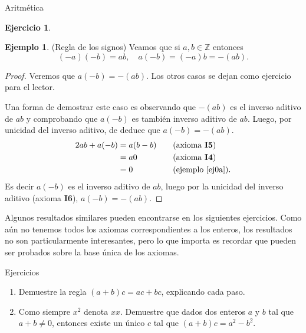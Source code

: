 \documentclass[11pt,spanish,makeidx]{amsbook}
\theoremstyle{definition}
\newtheorem{ejemplo}{Ejemplo}[section]
\newtheorem{ejercicio}{Ejercicio}[section]
\theoremstyle{remark}
\begin{document}
\begin{section}{Aritmética}
\begin{ejercicio}
\end{ejercicio}

\begin{ejemplo} (Regla de los signos) Veamos que  si $a,b \in \mathbb Z$ entonces
$$
(-a)(-b) = ab ,\quad a(-b) = (-a)b = -(ab).
$$
\end{ejemplo}
\begin{proof}
Veremos que  $a(-b) = -(ab)$. Los otros casos se dejan como ejercicio para el lector.

Una forma de demostrar este caso es  observando que $-(ab)$ es el inverso aditivo de $ab$ y comprobando que $a(-b)$ es también inverso aditivo de $ab$. Luego, por unicidad del inverso aditivo, de deduce que $a(-b) = -(ab)$. 
\begin{alignat*}2
ab + a(-b) &=a(b-b)& &\text{(axioma {\bf I5})} \\
&=a0&\quad &\text{(axioma {\bf I4})}\\
&= 0 & &\text{(ejemplo \ref{ej0a})}.
\end{alignat*}
Es decir $a(-b)$ es el inverso aditivo de $ab$, luego por la unicidad del inverso aditivo (axioma {\bf I6}), $a(-b)=-(ab)$.
\end{proof}

Algunos resultados similares pueden encontrarse en los siguientes ejercicios. Como aún no tenemos todos los axiomas correspondientes a los enteros, los resultados no son particularmente interesantes, pero lo que importa es recordar que pueden ser probados sobre la base única de los axiomas.

\begin{subsection}{Ejercicios}
\begin{enumerate} 
\item
Demuestre la regla $(a+b)c=ac+bc$, explicando cada paso.
\item Como siempre $x^2$ denota $xx$. Demuestre que dados dos enteros $a$ y $b$ tal que $a+b \not=0$, entonces existe un único $c$ tal que $(a+b)c=
a^2 - b^2$.
\end{enumerate}
\end{subsection}

\end{section}
\end{document}
